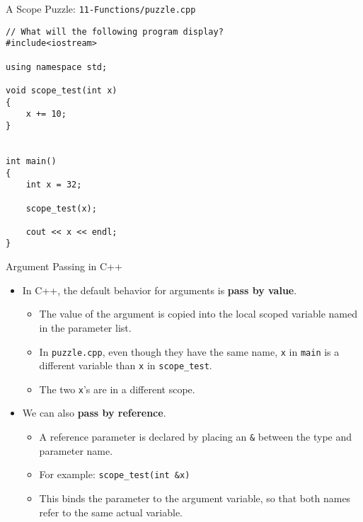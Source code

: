 \documentclass[]{beamer}
\begin{document}
\begin{frame}[fragile]{A Scope Puzzle: \texttt{11-Functions/puzzle.cpp}}
\begin{adjustbox}{max totalheight=0.9\textheight, max width=0.95\textwidth}
\begin{BVerbatim}
// What will the following program display?
#include<iostream>

using namespace std;

void scope_test(int x)
{
    x += 10;
}


int main()
{
    int x = 32;

    scope_test(x);

    cout << x << endl;
}
\end{BVerbatim}
\end{adjustbox}
\end{frame}


\begin{frame}{Argument Passing in C++}
    \begin{itemize}[<+(2)->]
        \item In C++, the default behavior for arguments is
            \textbf{pass by value}.
        \begin{itemize}
            \item The value of the argument is copied into the local
                scoped variable named in the parameter list.
            \item In \texttt{puzzle.cpp}, even though they have the
                same name, \texttt{x} in \texttt{main} is a different
                variable than \texttt{x} in \texttt{scope\_test}.
            \item The two \texttt{x}'s are in a different scope.
        \end{itemize}
        \item We can also \textbf{pass by reference}.
        \begin{itemize}
            \item A reference parameter is declared by placing an
                \texttt{\&} between the type and parameter name.
            \item For example: \texttt{scope\_test(int \&x)}
            \item This binds the parameter to the argument variable, 
                so that both names refer to the same actual variable.
        \end{itemize}
    \end{itemize}
\end{frame}
\end{document}
